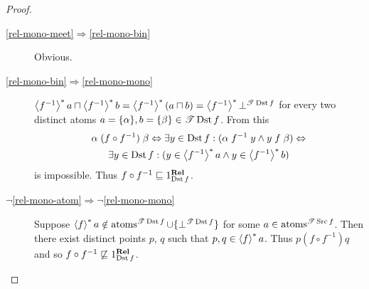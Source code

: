 \begin{proof}
\begin{description}
\item [{\ref{rel-mono-meet}$\Rightarrow$\ref{rel-mono-bin}}] Obvious.
\item [{\ref{rel-mono-bin}$\Rightarrow$\ref{rel-mono-mono}}] $\left\langle f^{-1}\right\rangle ^{\ast}a\sqcap\left\langle f^{-1}\right\rangle ^{\ast}b=\left\langle f^{-1}\right\rangle ^{\ast}(a\sqcap b)=\left\langle f^{-1}\right\rangle ^{\ast}\bot^{\mathscr{T}\operatorname{Dst} f}$
for every two distinct atoms $a=\{\alpha\},b=\{\beta\}\in\mathscr{T}\operatorname{Dst} f$.
From this 
\begin{multline*}
\alpha\mathrel{(f\circ f^{-1})}\beta\Leftrightarrow\exists y\in\operatorname{Dst} f:(\alpha\mathrel{f^{-1}}y\land y\mathrel{f}\beta)\Leftrightarrow\\
\exists y\in\operatorname{Dst} f:(y\in\left\langle f^{-1}\right\rangle ^{\ast}a\land y\in\left\langle f^{-1}\right\rangle ^{\ast}b)
\end{multline*}
 is impossible. Thus $f\circ f^{-1}\sqsubseteq1_{\operatorname{Dst} f}^{\mathbf{Rel}}$.
\item [{$\lnot$\ref{rel-mono-atom}$\Rightarrow\lnot$\ref{rel-mono-mono}}] Suppose
$\left\langle f\right\rangle ^{\ast}a\notin\operatorname{atoms}^{\mathscr{T}\operatorname{Dst} f}\cup\{\bot^{\mathscr{T}\operatorname{Dst} f}\}$
for some $a\in\operatorname{atoms}^{\mathscr{T}\operatorname{Src} f}$. Then there exist distinct
points $p$, $q$ such that $p,q\in\left\langle f\right\rangle ^{\ast}a$. Thus $p\mathrel{(f\circ f^{-1})}q$
and so $f\circ f^{-1}\not\sqsubseteq1_{\operatorname{Dst} f}^{\mathbf{Rel}}$.
\end{description}
\end{proof}

